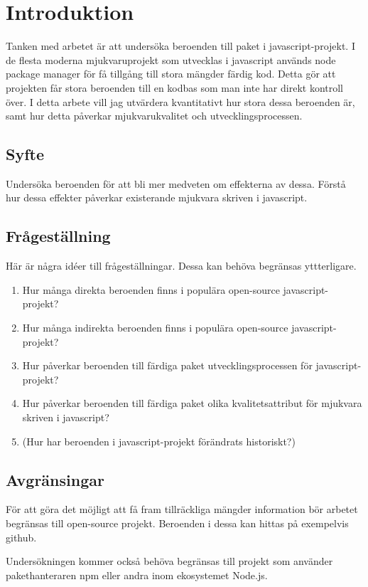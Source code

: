 \section{Introduktion}
\label{sec:joel_o-introduction}
Tanken med arbetet är att undersöka beroenden till paket i javascript-projekt. I de flesta moderna mjukvaruprojekt som utvecklas i javascript används node package manager för få tillgång till stora mängder färdig kod. Detta gör att projekten får stora beroenden till en kodbas som man inte har direkt kontroll över. I detta arbete vill jag utvärdera kvantitativt hur stora dessa beroenden är, samt hur detta påverkar mjukvarukvalitet och utvecklingsprocessen.

\subsection{Syfte}
Undersöka beroenden för att bli mer medveten om effekterna av dessa. Förstå hur dessa effekter påverkar existerande mjukvara skriven i javascript.

\subsection{Frågeställning}
\label{subsec:joel_o-research-questions}
Här är några idéer till frågeställningar. Dessa kan behöva begränsas yttterligare.

\begin{enumerate}
\item Hur många direkta beroenden finns i populära open-source javascript-projekt?

\item Hur många indirekta beroenden finns i populära open-source javascript-projekt?

\item Hur påverkar beroenden till färdiga paket utvecklingsprocessen för javascript-projekt?

\item Hur påverkar beroenden till färdiga paket olika kvalitetsattribut för mjukvara skriven i javascript?

\item (Hur har beroenden i javascript-projekt förändrats historiskt?)

\end{enumerate}

\subsection{Avgränsingar}
\label{subsec:joel_o-delimitations}
För att göra det möjligt att få fram tillräckliga mängder information bör arbetet begränsas till open-source projekt. Beroenden i dessa kan hittas på exempelvis github.

Undersökningen kommer också behöva begränsas till projekt som använder pakethanteraren npm eller andra inom ekosystemet Node.js.




